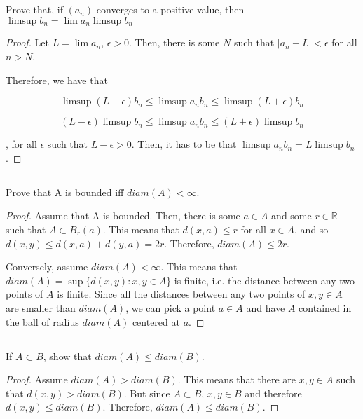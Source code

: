 \subsection*{} Prove that, if $(a_n)$ converges to a positive value, then $\limsup b_n = \lim a_n \limsup b_n$

\begin{proof}
Let $L = \lim a_n$, $\epsilon > 0$. Then, there is some $N$ such that $|a_n - L| < \epsilon$ for all $n>N$.

Therefore, we have that

$$ \limsup (L - \epsilon)b_n \leq \limsup a_nb_n \leq \limsup (L + \epsilon)b_n $$

$$ (L - \epsilon)\limsup b_n \leq \limsup a_nb_n \leq (L + \epsilon)\limsup b_n $$

, for all $\epsilon$ such that $L-\epsilon>0$. Then, it has to be that $\limsup a_nb_n = L\limsup b_n$.

\end{proof}


\subsection{} Prove that A is bounded iff $diam(A) < \infty$.

\begin{proof}
Assume that A is bounded. Then, there is some $a \in A$ and some $r \in \mathbb{R}$ such that $A \subset B_r(a)$. This means that $d(x,a) \leq r$ for all $x \in A$, and so $d(x,y) \leq d(x,a) + d(y,a) = 2r$. Therefore, $diam(A) \leq 2r$.

Conversely, assume $diam(A) < \infty$. This means that $diam(A) = \sup\{d(x,y) : x,y\in A\}$ is finite, i.e. the distance between any two points of $A$ is finite. Since all the distances between any two points of $x,y \in A$ are smaller than $diam(A)$, we can pick a point $a \in A$ and have $A$ contained in the ball of radius $diam(A)$ centered at $a$.
\end{proof}

\subsection{} If $A \subset B$, show that $diam(A) \leq diam(B)$.

\begin{proof}
Assume $diam(A) > diam(B)$. This means that there are $x,y \in A$ such that $d(x,y) > diam(B)$. But since $A \subset B$, $x,y \in B$ and therefore $d(x,y) \leq diam(B)$. Therefore, $diam(A) \leq diam(B)$.
\end{proof}

